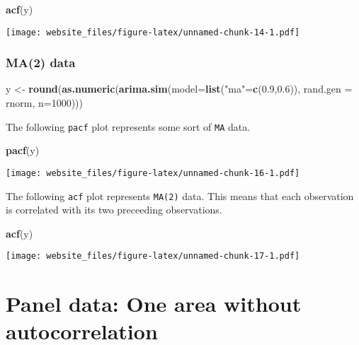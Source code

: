 \documentclass[]{book}
\newenvironment{Shaded}{\begin{snugshade}}{\end{snugshade}}
\newcommand{\KeywordTok}[1]{\textcolor[rgb]{0.13,0.29,0.53}{\textbf{#1}}}
\newcommand{\DataTypeTok}[1]{\textcolor[rgb]{0.13,0.29,0.53}{#1}}
\newcommand{\DecValTok}[1]{\textcolor[rgb]{0.00,0.00,0.81}{#1}}
\newcommand{\FloatTok}[1]{\textcolor[rgb]{0.00,0.00,0.81}{#1}}
\newcommand{\StringTok}[1]{\textcolor[rgb]{0.31,0.60,0.02}{#1}}
\newcommand{\NormalTok}[1]{#1}
\begin{document}
\begin{Shaded}
\begin{Highlighting}[]
\KeywordTok{acf}\NormalTok{(y)}
\end{Highlighting}
\end{Shaded}

\texttt{[image: website\_files/figure-latex/unnamed-chunk-14-1.pdf]}

\newpage 

\subsection{MA(2) data}\label{ma2-data}

\begin{Shaded}
\begin{Highlighting}[]
\NormalTok{y <-}\StringTok{ }\KeywordTok{round}\NormalTok{(}\KeywordTok{as.numeric}\NormalTok{(}\KeywordTok{arima.sim}\NormalTok{(}\DataTypeTok{model=}\KeywordTok{list}\NormalTok{(}\StringTok{"ma"}\NormalTok{=}\KeywordTok{c}\NormalTok{(}\FloatTok{0.9}\NormalTok{,}\FloatTok{0.6}\NormalTok{)), }\DataTypeTok{rand.gen =}\NormalTok{ rnorm, }\DataTypeTok{n=}\DecValTok{1000}\NormalTok{)))}
\end{Highlighting}
\end{Shaded}

The following \texttt{pacf} plot represents some sort of \texttt{MA}
data.

\begin{Shaded}
\begin{Highlighting}[]
\KeywordTok{pacf}\NormalTok{(y)}
\end{Highlighting}
\end{Shaded}

\texttt{[image: website\_files/figure-latex/unnamed-chunk-16-1.pdf]}

\newpage

The following \texttt{acf} plot represents \texttt{MA(2)} data. This
means that each observation is correlated with its two preceeding
observations.

\begin{Shaded}
\begin{Highlighting}[]
\KeywordTok{acf}\NormalTok{(y)}
\end{Highlighting}
\end{Shaded}

\texttt{[image: website\_files/figure-latex/unnamed-chunk-17-1.pdf]}

\chapter{Panel data: One area without
autocorrelation}\label{panel-data-one-area-without-autocorrelation}
\end{document}
